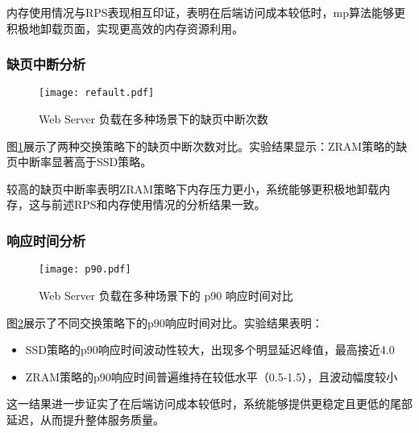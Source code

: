 内存使用情况与RPS表现相互印证，表明在后端访问成本较低时，mp算法能够更积极地卸载页面，实现更高效的内存资源利用。

\subsubsection{缺页中断分析}
\begin{figure}[htb]
    \centering
    \texttt{[image: refault.pdf]}
    \caption{Web Server 负载在多种场景下的缺页中断次数}
    \label{fig:refault}
\end{figure}
图\ref{fig:refault}展示了两种交换策略下的缺页中断次数对比。实验结果显示：ZRAM策略的缺页中断率显著高于SSD策略。

较高的缺页中断率表明ZRAM策略下内存压力更小，系统能够更积极地卸载内存，这与前述RPS和内存使用情况的分析结果一致。

\subsubsection{响应时间分析}
\begin{figure}[htb]
    \centering
    \texttt{[image: p90.pdf]}
    \caption{Web Server 负载在多种场景下的 p90 响应时间对比}
    \label{fig:p90}
\end{figure}
图\ref{fig:p90}展示了不同交换策略下的p90响应时间对比。实验结果表明：
\begin{itemize}
    \item SSD策略的p90响应时间波动性较大，出现多个明显延迟峰值，最高接近4.0
    \item ZRAM策略的p90响应时间普遍维持在较低水平（0.5-1.5），且波动幅度较小
\end{itemize}

这一结果进一步证实了在后端访问成本较低时，系统能够提供更稳定且更低的尾部延迟，从而提升整体服务质量。


